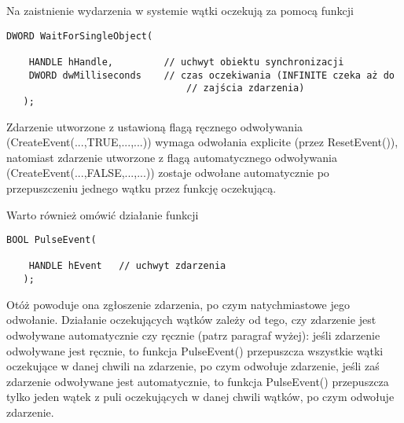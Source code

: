Na zaistnienie wydarzenia w systemie wątki oczekują za pomocą 
funkcji 

\begin{scriptsize}
\begin{verbatim}
DWORD WaitForSingleObject(

    HANDLE hHandle,	        // uchwyt obiektu synchronizacji
    DWORD dwMilliseconds 	// czas oczekiwania (INFINITE czeka aż do 
                                // zajścia zdarzenia)
   );
\end{verbatim}
\end{scriptsize}

Zdarzenie utworzone z ustawioną flagą ręcznego odwoływania 
(CreateEvent(...,TRUE,...,...)) wymaga odwołania explicite (przez ResetEvent()), 
natomiast zdarzenie utworzone z flagą automatycznego odwoływania (CreateEvent(...,FALSE,...,...)) 
zostaje odwołane automatycznie po przepuszczeniu jednego wątku przez funkcję oczekującą. 

Warto również omówić działanie funkcji 

\begin{scriptsize}
\begin{verbatim}
BOOL PulseEvent(

    HANDLE hEvent 	// uchwyt zdarzenia
   );
\end{verbatim}
\end{scriptsize}

Otóż powoduje ona zgłoszenie zdarzenia, po czym natychmiastowe jego odwołanie. 
Działanie oczekujących wątków zależy od tego, czy zdarzenie jest odwoływane 
automatycznie czy ręcznie (patrz paragraf wyżej): jeśli zdarzenie odwoływane jest ręcznie, 
to funkcja PulseEvent() przepuszcza wszystkie wątki oczekujące w danej chwili na zdarzenie, 
po czym odwołuje zdarzenie, jeśli zaś zdarzenie odwoływane jest automatycznie, to funkcja 
PulseEvent() przepuszcza tylko jeden wątek z puli oczekujących w danej chwili 
wątków, po czym odwołuje zdarzenie. 

